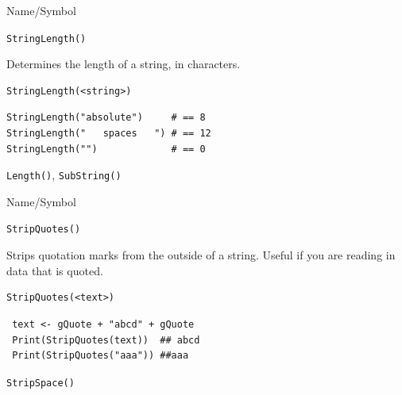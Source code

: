 \begin{desc}{Name/Symbol}
\item[Name/Symbol]  	\verb+StringLength()+

\item[Description] 	Determines the length of a string, in characters.

\item[Usage]
\begin{verbatim}
StringLength(<string>)
\end{verbatim}

\item[Example]     	
\begin{verbatim}
StringLength("absolute")     # == 8
StringLength("   spaces   ") # == 12
StringLength("")             # == 0
\end{verbatim}

\item[See Also]    	\verb+Length()+, \verb+SubString()+
\end{desc}




\begin{desc}{Name/Symbol}
\item[Name/Symbol]  	\verb+StripQuotes()+

\item[Description] 	Strips quotation marks from the outside of a
  string.  Useful if you are reading in data that is quoted.


\item[Usage]
\begin{verbatim}
StripQuotes(<text>)
\end{verbatim}

\item[Example]     	
\begin{verbatim}
 text <- gQuote + "abcd" + gQuote
 Print(StripQuotes(text))  ## abcd
 Print(StripQuotes("aaa")) ##aaa
\end{verbatim}

\item[See Also]    	\verb+StripSpace()+
\end{desc}



